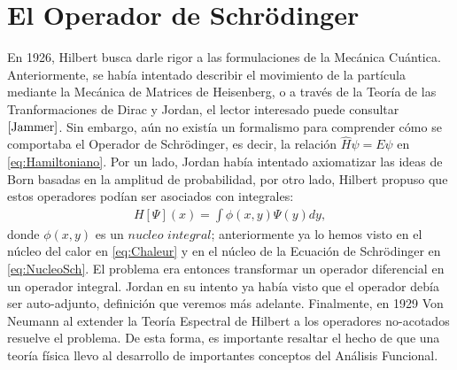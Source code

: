 \documentclass[12pt]{article}
\theoremstyle{definition}
\begin{document}
\newpage

\section{El Operador de Schrödinger}
\noindent
En 1926, Hilbert busca darle rigor a las formulaciones de la Mecánica Cuántica. Anteriormente, se había intentado describir el movimiento de la partícula mediante la Mecánica de Matrices de Heisenberg, o a través de la Teoría de las Tranformaciones de Dirac y Jordan, el lector interesado puede consultar $\cite{Jammer}$.  Sin embargo, aún no existía un formalismo para comprender cómo se comportaba el Operador de Schrödinger, es decir, la relación $\hat{H}\psi = E\psi$ en \eqref{eq:Hamiltoniano}. Por un lado, Jordan había intentado axiomatizar las ideas de Born basadas en la amplitud de probabilidad, por otro lado, Hilbert propuso que estos operadores podían ser asociados con integrales:
\begin{align}
    H[\Psi](x) = \int \phi(x,y)\Psi(y)dy,
    \label{eq:Example}
\end{align}
donde $\phi(x,y)$ es un $\textit{nucleo integral}$; anteriormente ya lo hemos visto en el núcleo del calor en \eqref{eq:Chaleur} y en el núcleo de la Ecuación de Schrödinger en \eqref{eq:NucleoSch}. El problema era entonces transformar un operador diferencial en un operador integral. Jordan en su intento ya había visto que el operador debía ser auto-adjunto, definición que veremos más adelante. Finalmente, en 1929 Von Neumann al extender la Teoría Espectral de Hilbert a los operadores no-acotados resuelve el problema. De esta forma, es importante resaltar el hecho de que una teoría física llevo al desarrollo de importantes conceptos del Análisis Funcional. 
\end{document}
